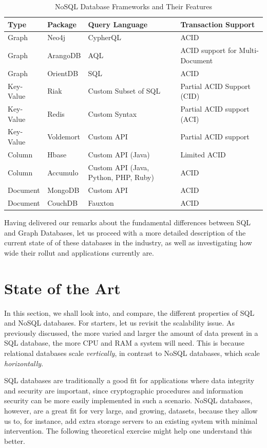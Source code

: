 \documentclass[10pt,        %
               a4paper,     %
               journal,     %
               ]{IEEEtran}
\begin{document}
\begin{table}[!t]
	\renewcommand{\arraystretch}{1.3} %
	\caption{NoSQL Database Frameworks and Their Features}
	\label{table_types_nosql}
	\centering
	\begin{tabular}{|p{1.1cm}|p{1.2cm}|p{2.3cm}|p{2.3cm}|} 
		\hline
		Type & Package & Query Language & Transaction Support  \\
		\hline
		Graph & Neo4j & CypherQL & ACID \\
		\hline
		Graph & ArangoDB & AQL & ACID support for Multi-Document \\
		\hline
		Graph & OrientDB & SQL & ACID \\
		\hline
		Key-Value & Riak & Custom Subset of SQL &  Partial ACID Support (CID)\\
		\hline
		Key-Value & Redis & Custom Syntax & Partial ACID support (ACI)\\
		\hline
		Key-Value & Voldemort & Custom API & Partial ACID support \\
		\hline
		Column & Hbase & Custom API (Java) & Limited ACID\\
		\hline
		Column & Accumulo & Custom API (Java, Python, PHP, Ruby) & ACID \\
		\hline
		Document & MongoDB & Custom API & ACID \\
		\hline
		Document & CouchDB & Fauxton \cite{gh_couchdb} & ACID \\
		\hline
	\end{tabular}
\end{table}

Having delivered our remarks about the fundamental differences between SQL and Graph Databases, let us proceed with a more detailed description of the current state of of these databases in the industry, as well as investigating how wide their rollut and applications currently are.

\section{State of the Art}
In this section, we shall look into, and compare, the different properties of SQL and NoSQL databases. For starters, let us revisit the scalability issue. As previously discussed, the more varied and larger the amount of data present in a SQL database, the more CPU and RAM a system will need. This is because relational databases scale \textit{vertically}, in contrast to NoSQL databases, which scale \textit{horizontally}. \par
SQL databases are traditionally a good fit for applications where data integrity and security are important, since cryptographic procedures and information security can be more easily implemented in such a scenario. NoSQL databases, however, are a great fit for very large, and growing, datasets, because they allow us to, for instance, add extra storage servers to an existing system with minimal intervention. The following theoretical exercise might help one understand this better. \par
\end{document}

